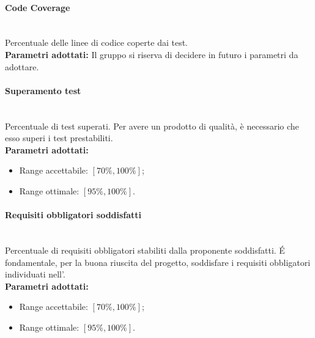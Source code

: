 \paragraph{Code Coverage}\mbox{}\\[0,3cm]
Percentuale delle linee di codice coperte dai test.\\[0,2cm]
\textbf{Parametri adottati:\newline}
Il gruppo \gruppo \space si riserva di decidere in futuro i parametri da adottare.

\paragraph{Superamento test}\mbox{}\\[0,3cm]
Percentuale di test superati. Per avere un prodotto di qualità, è necessario che esso superi i test prestabiliti.\\[0,2cm]
\textbf{Parametri adottati:}
\begin{itemize}
	\item Range accettabile: $[70\%,100\%]$;
	\item Range ottimale: $[95\%,100\%]$.
\end{itemize}

\paragraph{Requisiti obbligatori soddisfatti}\mbox{}\\[0,3cm]
Percentuale di requisiti obbligatori stabiliti dalla proponente soddisfatti. \'E fondamentale, per la buona riuscita del progetto, soddisfare i requisiti obbligatori individuati nell'\AdR .\\[0,2cm]
\textbf{Parametri adottati:}
\begin{itemize}
	\item Range accettabile: $[70\%,100\%]$;
	\item Range ottimale: $[95\%,100\%]$.
\end{itemize}
	
